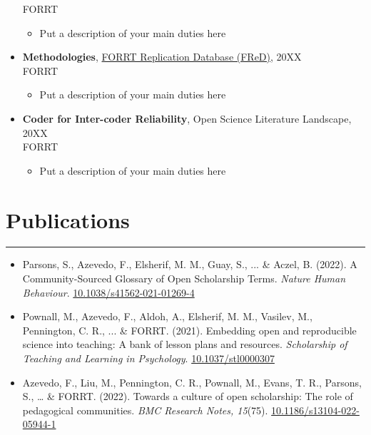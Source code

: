 \documentclass{article}
\begin{document}
\begin{itemize}[leftmargin=*]
    FORRT
    \begin{itemize}
        \item Put a description of your main duties here
    \end{itemize}
\item \textbf{Methodologies}, \href{https://forrt.org/apps/fred_explorer.html}{FORRT Replication Database (FReD)}, 20XX\\
    FORRT
    \begin{itemize}
        \item Put a description of your main duties here
    \end{itemize}
\item \textbf{Coder for Inter-coder Reliability}, {Open Science Literature Landscape}, 20XX\\
    FORRT
    \begin{itemize}
        \item Put a description of your main duties here
    \end{itemize}
\end{itemize}

\section*{Publications}
\hrule
\vspace{1em}
\begin{itemize}[leftmargin=*]
   \item[]{\noindent Parsons, S., Azevedo, F., Elsherif, M. M., Guay, S., ... \& Aczel, B. (2022). A Community-Sourced Glossary of Open Scholarship Terms. \textit{Nature Human Behaviour}. \href{https://doi.org/10.1038/s41562-021-01269-4}{\color{BlueViolet}10.1038/s41562-021-01269-4}}

   \item[]{\noindent Pownall, M., Azevedo, F., Aldoh, A., Elsherif, M. M., Vasilev, M., Pennington, C. R., ... \& FORRT. (2021). Embedding open and reproducible science into teaching: A bank of lesson plans and resources. \textit{Scholarship of Teaching and Learning in Psychology}. \href{https://doi.org/10.1037/stl0000307}{\color{BlueViolet}10.1037/stl0000307}}

   \item[]{\noindent Azevedo, F., Liu, M., Pennington, C. R., Pownall, M., Evans, T. R., Parsons, S., … \& FORRT. (2022). Towards a culture of open scholarship: The role of pedagogical communities. \textit{BMC Research Notes, 15}(75). \href{https://doi.org/10.1186/s13104-022-05944-1}{\color{BlueViolet}10.1186/s13104-022-05944-1}}
\end{itemize}
\end{document}
